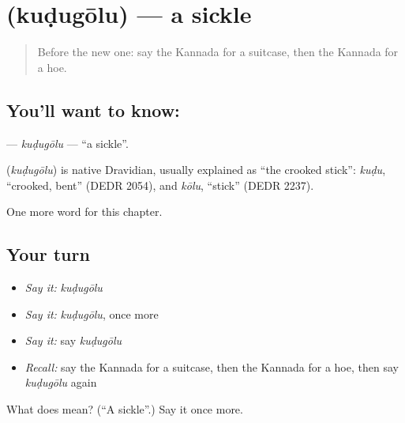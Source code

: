 \section[\texorpdfstring{\kn{ಕುಡುಗೋಲು} (kuḍugōlu)}{ಕುಡುಗೋಲು (kuḍugōlu)}]{ (kuḍugōlu) — a sickle}

\label{lesson:KA-C230-kudugolu}



\begin{quote}
Before the new one: say the Kannada for a suitcase, then the Kannada for a hoe.
\end{quote}

\subsection*{You'll want to know: }
\textbf{} — \emph{kuḍugōlu} — \textquotedblleft{}a sickle\textquotedblright{}.

\begin{cousinweb}
\textbf{} (\emph{kuḍugōlu}) is native Dravidian, usually explained as \textquotedblleft{}the crooked stick\textquotedblright{}: \emph{kuḍu}, \textquotedblleft{}crooked, bent\textquotedblright{} (DEDR 2054), and \emph{kōlu}, \textquotedblleft{}stick\textquotedblright{} (DEDR 2237).
\end{cousinweb}

\begin{grammarlens}[title={What you've built}]
One more word for this chapter.
\end{grammarlens}

\subsection*{Your turn}
\begin{itemize}
\raggedright
  \item \emph{Say it:} \emph{kuḍugōlu}
  \item \emph{Say it:} \emph{kuḍugōlu}, once more
  \item \emph{Say it:} say \emph{kuḍugōlu}
  \item \emph{Recall:} say the Kannada for a suitcase, then the Kannada for a hoe, then say \emph{kuḍugōlu} again
\end{itemize}

\begin{tcolorbox}[breakable,colback=teal!4,colframe=teal!35!black,title={Before you move on}]
What does  mean? (\textquotedblleft{}A sickle\textquotedblright{}.) Say it once more.
\end{tcolorbox}
